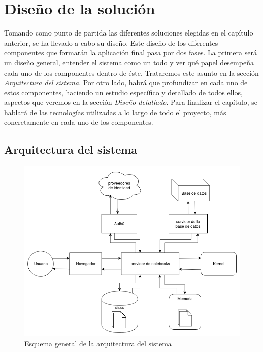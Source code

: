 \documentclass[11pt,spanish,listoffigures,listoftables]{tfgetsinf}
\begin{document}


\chapter{Diseño de la solución}
\label{ch:diseno-solu}

Tomando como punto de partida las diferentes soluciones elegidas en el capítulo anterior, se ha llevado a cabo su diseño. Este diseño de los diferentes componentes que formarán la aplicación final pasa por dos fases. La primera será un diseño general, entender el sistema como un todo y ver qué papel desempeña cada uno de los componentes dentro de éste. Trataremos este asunto en la sección \textit{Arquitectura del sistema}. Por otro lado, habrá que profundizar en cada uno de estos componentes, haciendo un estudio específico y detallado de todos ellos, aspectos que veremos en la sección \textit{Diseño detallado}. Para finalizar el capítulo, se hablará de las tecnologías utilizadas a lo largo de todo el proyecto, más concretamente en cada uno de los componentes.



\section{Arquitectura del sistema}
\label{sec:arquitectura-sistema}

\begin{figure}[h]
	\centering
  	\includegraphics[width=1\textwidth]{Architecture.png}
  	\caption{Esquema general de la arquitectura del sistema}
  	\label{fig:general-arch}
\end{figure}
\end{document}
